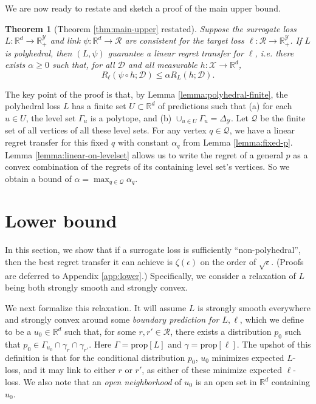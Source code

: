 \documentclass{article}
\newtheorem{theorem}{Theorem}
\theoremstyle{definition}\newtheorem{definition}{Definition}
\theoremstyle{definition}\newtheorem{assumption}{Assumption}
\newcommand{\reals}{\mathbb{R}}
\newcommand{\prop}[1]{\mathrm{prop}[#1]}
\newcommand{\simplex}{\Delta_\Y}
\newcommand{\D}{\mathcal{D}}
\newcommand{\R}{\mathcal{R}}
\newcommand{\X}{\mathcal{X}}
\newcommand{\Y}{\mathcal{Y}}
\begin{document}
We are now ready to restate and sketch a proof of the main upper bound.
\begin{theorem}[Theorem \ref{thm:main-upper} restated] \label{thm:main-upper-details}
  Suppose the surrogate loss $L: \reals^d \to \reals_+^{\Y}$ and link $\psi: \reals^d \to \R$ are consistent for the target loss $\ell: \R \to \reals_+^{\Y}$.
  If $L$ is polyhedral, then $(L,\psi)$ guarantee a linear regret transfer for $\ell$, i.e. there exists $\alpha \geq 0$ such that, for all $\D$ and all measurable $h: \X \to \reals^d$,
    \[ R_{\ell}(\psi \circ h ; \D) \leq \alpha R_L(h ; \D) . \]
\end{theorem}
The key point of the proof is that, by Lemma \ref{lemma:polyhedral-finite}, the polyhedral loss $L$ has a finite set $U \subset \reals^d$ of predictions such that (a) for each $u \in U$, the level set $\Gamma_u$ is a polytope, and (b) $\cup_{u \in U} \Gamma_u = \simplex$.
Let $\mathcal{Q}$ be the finite set of all vertices of all these level sets.
For any vertex $q \in \mathcal{Q}$, we have a linear regret transfer for this fixed $q$ with constant $\alpha_q$ from Lemma \ref{lemma:fixed-p}.
Lemma \ref{lemma:linear-on-levelset} allows us to write the regret of a general $p$ as a convex combination of the regrets of its containing level set's vertices.
So we obtain a bound of $\alpha = \max_{q \in \mathcal{Q}} \alpha_q$.


\section{Lower bound} \label{sec:lower}

In this section, we show that if a surrogate loss is sufficiently ``non-polyhedral'', then the best regret transfer it can achieve is $\zeta(\epsilon)$ on the order of $\sqrt{\epsilon}$.
(Proofs are deferred to Appendix \ref{app:lower}.)
Specifically, we consider a relaxation of $L$ being both strongly smooth and strongly convex.

We next formalize this relaxation.
It will assume $L$ is strongly smooth everywhere and strongly convex around some \emph{boundary prediction for $L,\ell$}, which we define to be a $u_0 \in \reals^d$ such that, for some $r,r' \in \R$, there exists a distribution $p_0$ such that $p_0 \in \Gamma_{u_0} \cap \gamma_r \cap \gamma_{r'}$.
Here $\Gamma = \prop{L}$ and $\gamma = \prop{\ell}$.
The upshot of this definition is that for the conditional distribution $p_0$, $u_0$ minimizes expected $L$-loss, and it may link to either $r$ or $r'$, as either of these minimize expected $\ell$-loss.
We also note that an \emph{open neighborhood} of $u_0$ is an open set in $\reals^d$ containing $u_0$.
\end{document}
